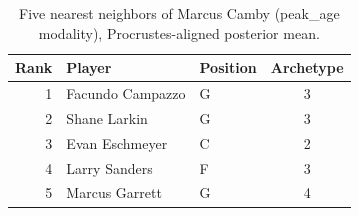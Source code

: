 \begin{table}[htbp]
  \centering\small
  \begin{tabular}{rllc}
    \toprule
    Rank & Player & Position & Archetype \\
    \midrule
    1 & Facundo Campazzo & G & 3 \\
    2 & Shane Larkin & G & 3 \\
    3 & Evan Eschmeyer & C & 2 \\
    4 & Larry Sanders & F & 3 \\
    5 & Marcus Garrett & G & 4 \\
    \bottomrule
  \end{tabular}
  \caption{Five nearest neighbors of Marcus Camby (peak_age modality), Procrustes-aligned posterior mean.}
  \label{tab:Marcus_Camby_neighbors_peak_age}
\end{table}

